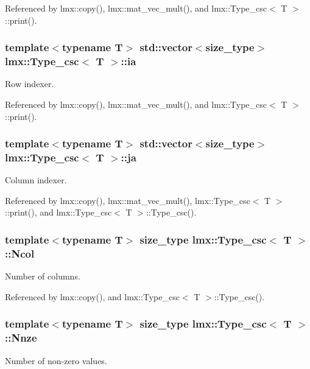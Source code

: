Referenced by lmx\-::copy(), lmx\-::mat\-\_\-vec\-\_\-mult(), and lmx\-::\-Type\-\_\-csc$<$ T $>$\-::print().

\hypertarget{classlmx_1_1Type__csc_ad149a245b902861d26367af5a98d38c2}{
\subsubsection[{ia}]{\setlength{\rightskip}{0pt plus 5cm}template$<$typename T$>$ std\-::vector$<${\bf size\-\_\-type}$>$ {\bf lmx\-::\-Type\-\_\-csc}$<$ T $>$\-::ia}}\label{classlmx_1_1Type__csc_ad149a245b902861d26367af5a98d38c2}
Row indexer. 

Referenced by lmx\-::copy(), lmx\-::mat\-\_\-vec\-\_\-mult(), and lmx\-::\-Type\-\_\-csc$<$ T $>$\-::print().

\hypertarget{classlmx_1_1Type__csc_a0fec1fc6c8a69fc5727063220d220eee}{
\subsubsection[{ja}]{\setlength{\rightskip}{0pt plus 5cm}template$<$typename T$>$ std\-::vector$<${\bf size\-\_\-type}$>$ {\bf lmx\-::\-Type\-\_\-csc}$<$ T $>$\-::ja}}\label{classlmx_1_1Type__csc_a0fec1fc6c8a69fc5727063220d220eee}
Column indexer. 

Referenced by lmx\-::copy(), lmx\-::mat\-\_\-vec\-\_\-mult(), lmx\-::\-Type\-\_\-csc$<$ T $>$\-::print(), and lmx\-::\-Type\-\_\-csc$<$ T $>$\-::\-Type\-\_\-csc().

\hypertarget{classlmx_1_1Type__csc_ac201c80e090b62791f8a95d6f1e3b07c}{
\subsubsection[{Ncol}]{\setlength{\rightskip}{0pt plus 5cm}template$<$typename T$>$ {\bf size\-\_\-type} {\bf lmx\-::\-Type\-\_\-csc}$<$ T $>$\-::Ncol}}\label{classlmx_1_1Type__csc_ac201c80e090b62791f8a95d6f1e3b07c}
Number of columns. 

Referenced by lmx\-::copy(), and lmx\-::\-Type\-\_\-csc$<$ T $>$\-::\-Type\-\_\-csc().

\hypertarget{classlmx_1_1Type__csc_ade9e149ea4925d6cc97727bbf07f080e}{
\subsubsection[{Nnze}]{\setlength{\rightskip}{0pt plus 5cm}template$<$typename T$>$ {\bf size\-\_\-type} {\bf lmx\-::\-Type\-\_\-csc}$<$ T $>$\-::Nnze}}\label{classlmx_1_1Type__csc_ade9e149ea4925d6cc97727bbf07f080e}
Number of non-\/zero values. 


